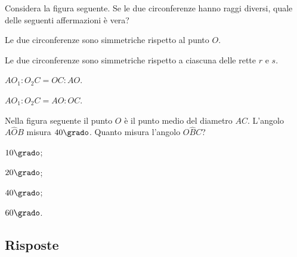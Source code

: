 \begin{esercizio}
\label{ese:5.67}
Considera la figura seguente. Se le due circonferenze hanno raggi 
diversi, quale delle seguenti affermazioni è vera?
\begin{enumeratea}
\item Le due circonferenze sono simmetriche rispetto al punto \(O\).
\item Le due circonferenze sono simmetriche rispetto a ciascuna delle 
rette \(r\) e \(s\).
\item \(AO_1:O_2C=OC:AO\).
\item \(AO_1:O_2C=AO:OC\).
\end{enumeratea}
\end{esercizio}

\begin{inaccessibleblock}
 \begin{figure}[!htb]
	\centering
\end{figure}
\end{inaccessibleblock}

\noindent\begin{minipage}{0.65\textwidth}\parindent15pt
\begin{esercizio}
\label{ese:5.68}
Nella figura seguente il punto \(O\) è il punto medio del diametro 
\(AC\). L'angolo \(A\widehat{O}B\) misura \(40\grado\). Quanto misura 
l'angolo \(O\widehat{B}C\)? 
\begin{multicols}{4}
\begin{enumeratea}
\item \(10\grado\);
\item \(20\grado\);
\item \(40\grado\);
\item \(60\grado\).
\end{enumeratea}
\end{multicols}
\end{esercizio}
\end{minipage}\hfil
\begin{minipage}{0.35\textwidth}
	\centering
\end{minipage}\vspace{5pt}


\subsection{Risposte}

\begingroup
\hypersetup{linkcolor=black}

